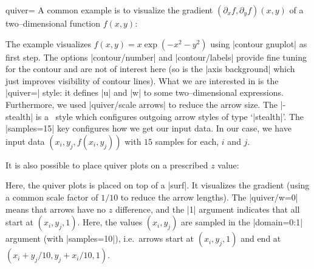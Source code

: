 {\begin{plottype}[/pgfplots]{quiver=\textcolor{black}{}}
	A common example is to visualize the gradient $(\partial_x f,\partial_y f)(x,y)$ of a two--dimensional function $f(x,y)$:
\pgfplotsexpensiveexample
\begin{codeexample}[]
\end{codeexample}
	\noindent The example visualizes $f(x,y) = x\exp(-x^2-y^2)$ using |contour gnuplot| as first step. The options |contour/number| and |contour/labels| provide fine tuning for the contour and are not of interest here (so is the |axis background| which just improves visibility of contour lines). What we are interested in is the |quiver=| style: it defines |u| and |w| to some two--dimensional expressions. Furthermore, we used |quiver/scale arrows| to reduce the arrow size. The |-stealth| is a \Tikz\ style which configures outgoing arrow styles of type `|stealth|'. The |samples=15| key configures how we get our input data. In our case, we have input data $(x_i,y_j,f(x_i,y_j))$ with $15$ samples for each, $i$ and $j$.

	It is also possible to place quiver plots on a prescribed $z$ value:
\pgfplotsexpensiveexample
\begin{codeexample}[]
\end{codeexample}
	\noindent Here, the quiver plots is placed on top of a |surf|. It visualizes the gradient (using a common scale factor of $1/10$ to reduce the arrow lengths). The |quiver/w=0| means that arrows have no $z$ difference, and the |{1}| argument indicates that all start at $(x_i,y_j,1)$. Here, the values $(x_i,y_j)$ are sampled in the |domain=0:1| argument (with |samples=10|), i.e.\ arrows start at $(x_i,y_j,1)$ and end at $(x_i+y_j/10, y_j+x_i/10, 1)$.


\end{plottype}}
